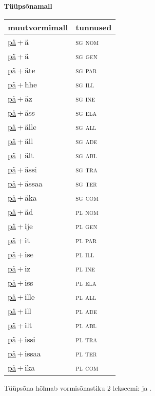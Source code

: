 
\vspace{1.8em}
\begin{minipage}{\textwidth}
\textbf{Tüüpsõnamall \,}\\

\begin{sideways}
\begin{tabular}{l l}
muutvormimall & tunnused \\
\hline
\underline{pä}\,+\,ä & \textsc{ sg nom } \\
\underline{pä}\,+\,ä & \textsc{ sg gen } \\
\underline{pä}\,+\,äte & \textsc{ sg par } \\
\underline{pä}\,+\,hhe & \textsc{ sg ill } \\
\underline{pä}\,+\,äz & \textsc{ sg ine } \\
\underline{pä}\,+\,äss & \textsc{ sg ela } \\
\underline{pä}\,+\,älle & \textsc{ sg all } \\
\underline{pä}\,+\,äll & \textsc{ sg ade } \\
\underline{pä}\,+\,ält & \textsc{ sg abl } \\
\underline{pä}\,+\,ässi & \textsc{ sg tra } \\
\underline{pä}\,+\,ässaa & \textsc{ sg ter } \\
\underline{pä}\,+\,äka & \textsc{ sg com } \\
\underline{pä}\,+\,äd & \textsc{ pl nom } \\
\underline{pä}\,+\,ije & \textsc{ pl gen } \\
\underline{pä}\,+\,it & \textsc{ pl par } \\
\underline{pä}\,+\,ise & \textsc{ pl ill } \\
\underline{pä}\,+\,iz & \textsc{ pl ine } \\
\underline{pä}\,+\,iss & \textsc{ pl ela } \\
\underline{pä}\,+\,ille & \textsc{ pl all } \\
\underline{pä}\,+\,ill & \textsc{ pl ade } \\
\underline{pä}\,+\,ilt & \textsc{ pl abl } \\
\underline{pä}\,+\,issi & \textsc{ pl tra } \\
\underline{pä}\,+\,issaa & \textsc{ pl ter } \\
\underline{pä}\,+\,ika & \textsc{ pl com } \\
\end{tabular}
\end{sideways}
\label{tab:tüüpsõnamall-pää}

\end{minipage}

 
\vspace{1em}
\noindent Tüüpsõna hõlmab vormisõnastiku 2 lekseemi:  ja .
